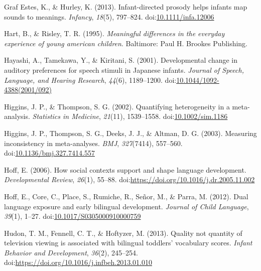 \documentclass[,man,floatsintext]{apa6}
\begin{document}
\leavevmode\hypertarget{ref-graf_estes_2013}{}%
Graf Estes, K., \& Hurley, K. (2013). Infant-directed prosody helps infants map sounds to meanings. \emph{Infancy}, \emph{18}(5), 797--824. doi:\href{https://doi.org/10.1111/infa.12006}{10.1111/infa.12006}

\leavevmode\hypertarget{ref-hart_1995}{}%
Hart, B., \& Risley, T. R. (1995). \emph{Meaningful differences in the everyday experience of young american children}. Baltimore: Paul H. Brookes Publishing.

\leavevmode\hypertarget{ref-hayashi_2001}{}%
Hayashi, A., Tamekawa, Y., \& Kiritani, S. (2001). Developmental change in auditory preferences for speech stimuli in Japanese infants. \emph{Journal of Speech, Language, and Hearing Research}, \emph{44}(6), 1189--1200. doi:\href{https://doi.org/10.1044/1092-4388(2001/092)}{10.1044/1092-4388(2001/092)}

\leavevmode\hypertarget{ref-higgins_2002}{}%
Higgins, J. P., \& Thompson, S. G. (2002). Quantifying heterogeneity in a meta-analysis. \emph{Statistics in Medicine}, \emph{21}(11), 1539--1558. doi:\href{https://doi.org/10.1002/sim.1186}{10.1002/sim.1186}

\leavevmode\hypertarget{ref-higgins_2003}{}%
Higgins, J. P., Thompson, S. G., Deeks, J. J., \& Altman, D. G. (2003). Measuring inconsistency in meta-analyses. \emph{BMJ}, \emph{327}(7414), 557--560. doi:\href{https://doi.org/10.1136/bmj.327.7414.557}{10.1136/bmj.327.7414.557}

\leavevmode\hypertarget{ref-hoff_2006}{}%
Hoff, E. (2006). How social contexts support and shape language development. \emph{Developmental Review}, \emph{26}(1), 55--88. doi:\href{https://doi.org/https://doi.org/10.1016/j.dr.2005.11.002}{https://doi.org/10.1016/j.dr.2005.11.002}

\leavevmode\hypertarget{ref-hoff_2012}{}%
Hoff, E., Core, C., Place, S., Rumiche, R., Señor, M., \& Parra, M. (2012). Dual language exposure and early bilingual development. \emph{Journal of Child Language}, \emph{39}(1), 1--27. doi:\href{https://doi.org/10.1017/S0305000910000759}{10.1017/S0305000910000759}

\leavevmode\hypertarget{ref-hudon_2013}{}%
Hudon, T. M., Fennell, C. T., \& Hoftyzer, M. (2013). Quality not quantity of television viewing is associated with bilingual toddlers' vocabulary scores. \emph{Infant Behavior and Development}, \emph{36}(2), 245--254. doi:\href{https://doi.org/https://doi.org/10.1016/j.infbeh.2013.01.010}{https://doi.org/10.1016/j.infbeh.2013.01.010}
\end{document}
